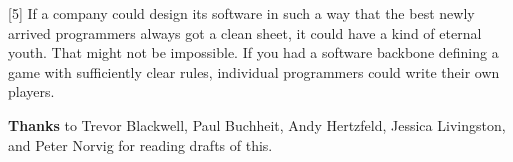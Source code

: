 [5] If a company could design its software in such a way that
                  the best newly arrived programmers always got a clean sheet,
                  it could have a kind of eternal youth. That might not be
                  impossible. If you had a software backbone defining a game
                  with sufficiently clear rules, individual programmers could
                  write their own players.






                  \textbf{Thanks} to Trevor Blackwell, Paul Buchheit, Andy
                  Hertzfeld, Jessica Livingston, and Peter Norvig for reading
                  drafts of this.


              
            
          
            
              
                


                  
              
            
          
